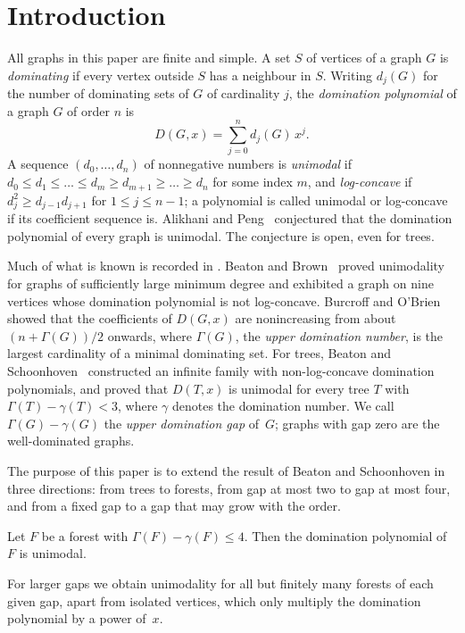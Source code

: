 \section{Introduction}\label{sec:intro}

All graphs in this paper are finite and simple. A set $S$ of vertices of a
graph $G$ is \emph{dominating} if every vertex outside $S$ has a neighbour
in $S$. Writing $d_j(G)$ for the number of dominating sets of $G$ of
cardinality $j$, the \emph{domination polynomial} of a graph $G$ of order $n$ is
\[
  D(G,x)=\sum_{j=0}^{n} d_j(G)\,x^j .
\]
A sequence $(d_0,\dots,d_n)$ of nonnegative numbers is \emph{unimodal} if
$d_0\le d_1\le\dots\le d_m\ge d_{m+1}\ge\dots\ge d_n$ for some index $m$, and
\emph{log-concave} if $d_j^2\ge d_{j-1}d_{j+1}$ for $1\le j\le n-1$; a
polynomial is called unimodal or log-concave if its coefficient sequence is.
Alikhani and Peng~\cite{AP} conjectured that the domination polynomial of
every graph is unimodal. The conjecture is open, even for trees.

Much of what is known is recorded in
\cite{BB22,BO,BS,DHP,GZ,Omar}. Beaton and Brown~\cite{BB22} proved unimodality for
graphs of sufficiently large minimum degree and exhibited a graph on nine
vertices whose domination polynomial is not log-concave. Burcroff and
O'Brien~\cite{BO} showed that the coefficients of $D(G,x)$ are nonincreasing
from about $(n+\Gamma(G))/2$ onwards, where $\Gamma(G)$, the \emph{upper
domination number}, is the largest cardinality of a minimal dominating set.
For trees, Beaton and Schoonhoven~\cite{BS} constructed an infinite family
with non-log-concave domination polynomials, and proved that $D(T,x)$ is
unimodal for every tree $T$ with $\Gamma(T)-\gamma(T)<3$, where $\gamma$
denotes the domination number. We call $\Gamma(G)-\gamma(G)$ the
\emph{upper domination gap} of~$G$; graphs with gap zero are the
well-dominated graphs.

The purpose of this paper is to extend the result of Beaton and Schoonhoven
in three directions: from trees to forests, from gap at most two to gap at
most four, and from a fixed gap to a gap that may grow with the order.

\begin{theorem}\label{thm:gapfour-intro}
Let $F$ be a forest with $\Gamma(F)-\gamma(F)\le 4$. Then the domination
polynomial of $F$ is unimodal.
\end{theorem}

For larger gaps we obtain unimodality for all but finitely many forests of
each given gap, apart from isolated vertices, which only multiply the
domination polynomial by a power of~$x$.

